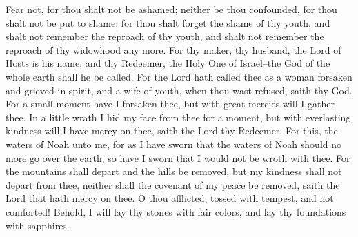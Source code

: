 Fear not, for thou shalt not be ashamed; neither be thou confounded, for thou shalt not be put to shame; for thou shalt forget the shame of thy youth, and shalt not remember the reproach of thy youth, and shalt not remember the reproach of thy widowhood any more.
\bverse \iffalse For thy maker, thy husband, the Lord of Hosts is his name; and thy Redeemer, the Holy One of Israel--the God of the whole earth shall he be called. \fi
For thy maker, thy husband, the Lord of Hosts is his name; and thy Redeemer, the Holy One of Israel--the God of the whole earth shall he be called.
\bverse \iffalse For the Lord hath called thee as a woman forsaken and grieved in spirit, and a wife of youth, when thou wast refused, saith thy God. \fi
For the Lord hath called thee as a woman forsaken and grieved in spirit, and a wife of youth, when thou wast refused, saith thy God.
\bverse \iffalse For a small moment have I forsaken thee, but with great mercies will I gather thee. \fi
For a small moment have I forsaken thee, but with great mercies will I gather thee.
\bverse \iffalse In a little wrath I hid my face from thee for a moment, but with everlasting kindness will I have mercy on thee, saith the Lord thy Redeemer. \fi
In a little wrath I hid my face from thee for a moment, but with everlasting kindness will I have mercy on thee, saith the Lord thy Redeemer.
\bverse \iffalse For this, the waters of Noah unto me, for as I have sworn that the waters of Noah should no more go over the earth, so have I sworn that I would not be wroth with thee. \fi
For this, the waters of Noah unto me, for as I have sworn that the waters of Noah should no more go over the earth, so have I sworn that I would not be wroth with thee.
\bverse \iffalse For the mountains shall depart and the hills be removed, but my kindness shall not depart from thee, neither shall the covenant of my peace be removed, saith the Lord that hath mercy on thee. \fi
For the mountains shall depart and the hills be removed, but my kindness shall not depart from thee, neither shall the covenant of my peace be removed, saith the Lord that hath mercy on thee.
\bverse \iffalse O thou afflicted, tossed with tempest, and not comforted!  Behold, I will lay thy stones with fair colors, and lay thy foundations with sapphires. \fi
O thou afflicted, tossed with tempest, and not comforted!  Behold, I will lay thy stones with fair colors, and lay thy foundations with sapphires.
\bverse \iffalse And I will make thy windows of agates, and thy gates of carbuncles, and all thy borders of pleasant stones. \fi
